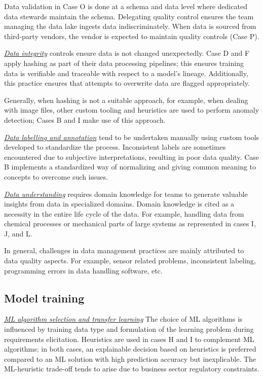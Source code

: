 \documentclass{IEEEcsmag}
\begin{document}
Data validation in Case O is done at a schema and data level where dedicated data stewards maintain the schema. Delegating quality control ensures the team managing the data lake ingests data indiscriminately. When data is sourced from third-party vendors, the vendor is expected to maintain quality controls (Case P).


\underline{\emph{Data integrity}}
controls ensure data is not changed unexpectedly. Case D and F apply hashing as part of their data processing pipelines; this ensures training data is verifiable and traceable with respect to a model's lineage. Additionally, this practice ensures that attempts to overwrite data are flagged appropriately.

Generally, when hashing is not a suitable approach, for example, when dealing with image files, other custom tooling and heuristics are used to perform anomaly detection; Cases B and I make use of this approach.

\underline{\emph{Data labelling and annotation}} tend to be undertaken manually using custom tools developed to standardize the process. Inconsistent labels are sometimes encountered due to subjective interpretations, resulting in poor data quality. Case B implements a standardized way of normalizing and giving common meaning to concepts to overcome such issues. 

\underline{\emph{Data understanding}} requires domain knowledge for teams to generate valuable insights from data in specialized domains. Domain knowledge is cited as a necessity in the entire life cycle of the data. For example, handling data from chemical processes or mechanical parts of large systems as represented in cases I, J, and L.

In general, challenges in data management practices are mainly attributed to data quality aspects. For example, sensor related problems, inconsistent labeling, programming errors in data handling software, etc. 

\subsection{Model training}

\underline{\emph{ML algorithm selection and transfer learning}}
The choice of ML algorithms is influenced by training data type and formulation of the learning problem during requirements elicitation. Heuristics are used in cases H and I to complement ML algorithms; in both cases, an explainable decision based on heuristics is preferred compared to an ML solution with high prediction accuracy but inexplicable. The ML-heuristic trade-off tends to arise due to business sector regulatory constraints.
\end{document}
